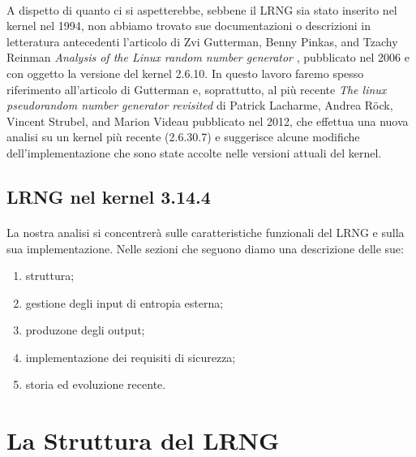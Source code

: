 \documentclass{article}
\begin{document}
\paragraph{}A dispetto di quanto ci si
aspetterebbe, sebbene il LRNG sia stato inserito nel kernel nel 1994, non
abbiamo trovato sue documentazioni o descrizioni in letteratura antecedenti
l'articolo di Zvi Gutterman, Benny Pinkas, and Tzachy Reinman \emph{Analysis of the Linux
random number generator} \cite{gutt}, pubblicato nel 2006 e con oggetto la
versione del kernel 2.6.10. In questo lavoro faremo spesso riferimento all'articolo di
Gutterman e, soprattutto, al più recente \emph{The linux pseudorandom number
generator revisited} di Patrick Lacharme, Andrea Röck, Vincent Strubel, and
Marion Videau \cite{lach}  pubblicato nel 2012, che effettua una nuova analisi
su un kernel più recente (2.6.30.7) e suggerisce alcune modifiche
dell'implementazione che sono state accolte nelle versioni attuali del kernel.

\subsection*{LRNG nel kernel 3.14.4}

\paragraph{}La nostra analisi si concentrerà sulle caratteristiche funzionali
del LRNG e sulla sua implementazione. Nelle sezioni che seguono diamo una
descrizione delle sue:
\begin{enumerate}
  \item struttura;
  \item gestione degli input di entropia esterna;
  \item produzone degli output;
  \item implementazione dei requisiti di sicurezza;
  \item storia ed evoluzione recente.
\end{enumerate}

\section{La Struttura del LRNG}
  
\end{document}
